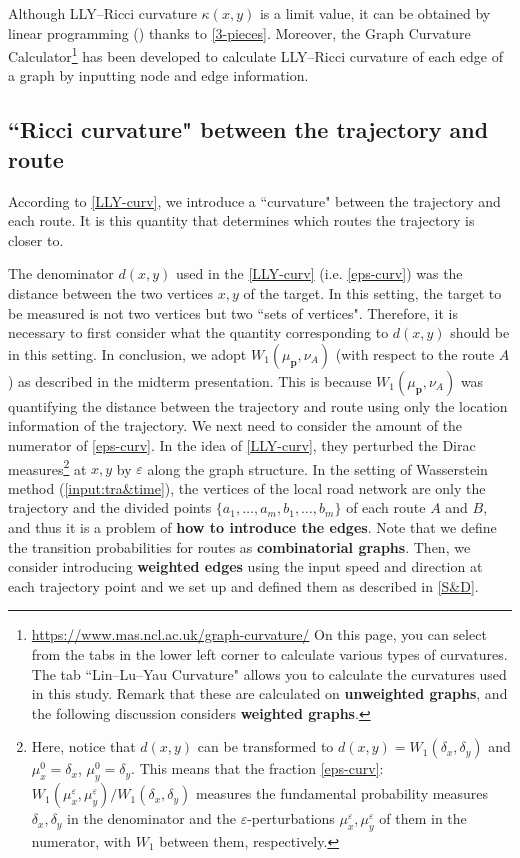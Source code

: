 \documentclass{article}
\numberwithin{equation}{section}
\theoremstyle{definition}
\newcommand{\dex}{\delta_x}
\newcommand{\dey}{\delta_y}
\newcommand{\eps}{\varepsilon} %
\newcommand{\kxy}{\kappa(x,y)}
\begin{document}
\begin{appendices}
Although LLY--Ricci curvature $\kxy$ is a limit value, it can be obtained by linear programming (\cite{CKLLS}) thanks to \autoref{3-pieces}.
Moreover, the Graph Curvature Calculator\footnote{\url{https://www.mas.ncl.ac.uk/graph-curvature/}
On this page, you can select from the tabs in the lower left corner to calculate various types of curvatures.
The tab ``Lin--Lu--Yau Curvature" allows you to calculate the curvatures used in this study.
Remark that these are calculated on \textbf{unweighted graphs}, and the following discussion considers \textbf{weighted graphs}.} 
has been developed to calculate LLY--Ricci curvature of each edge of a graph by inputting node and edge information.

\subsection{``Ricci curvature" between the trajectory and route} \label{subappendix:map-matching}

According to \autoref{LLY-curv}, we introduce a ``curvature" between the trajectory and each route.
It is this quantity that determines which routes the trajectory is closer to.

The denominator $d(x,y)$ used in the \autoref{LLY-curv} (i.e. \autoref{eps-curv}) was the distance between the two vertices $x,y$ of the target.
In this setting, the target to be measured is not two vertices but two ``sets of vertices".
Therefore, it is necessary to first consider what the quantity corresponding to $d(x,y)$ should be in this setting.
In conclusion, we adopt $W_1(\mu_\mathbf{p}, \nu_A)$ (with respect to the route $A$) as described in the midterm presentation.
This is because $W_1(\mu_\mathbf{p}, \nu_A)$ was quantifying the distance between the trajectory and route using only the location information of the trajectory.
We next need to consider the amount of the numerator of \autoref{eps-curv}.
In the idea of \autoref{LLY-curv}, they perturbed the Dirac measures\footnote{
Here, notice that $d(x,y)$ can be transformed to $d(x,y)=W_1(\dex,\dey)$ and $\mu_x^0=\dex$, $\mu_y^0=\dey$.
This means that the fraction \autoref{eps-curv}: $W_1(\mu_x^\eps,\mu_y^\eps)/W_1(\dex,\dey)$ measures the fundamental probability measures $\dex,\dey$ in the denominator and the $\eps$-perturbations $\mu_x^\eps,\mu_y^\eps$ of them in the numerator, with $W_1$ between them, respectively.}
at $x,y$ by $\eps$ along the graph structure.
In the setting of Wasserstein method (\autoref{input:tra&time}), the vertices of the local road network are only the trajectory and the divided points $\{a_1,\ldots,a_m,b_1,\dots,b_m\}$ of each route $A$ and $B$, and thus it is a problem of \textbf{how to introduce the edges}.
Note that we define the transition probabilities for routes as \textbf{combinatorial graphs}.
Then, we consider introducing \textbf{weighted edges} using the input speed and direction at each trajectory point and we set up and defined them as described in \autoref{S&D}.


\end{appendices}
\end{document}
